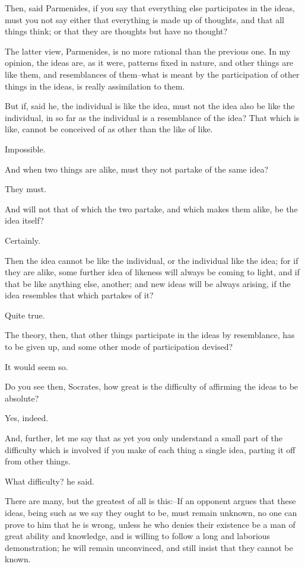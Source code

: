 Then, said Parmenides, if you say that everything else participates
in the ideas, must you not say either that everything is made up of
thoughts, and that all things think; or that they are thoughts but have
no thought?

The latter view, Parmenides, is no more rational than the previous one.
In my opinion, the ideas are, as it were, patterns fixed in nature, and
other things are like them, and resemblances of them--what is meant by
the participation of other things in the ideas, is really assimilation
to them.

But if, said he, the individual is like the idea, must not the idea also
be like the individual, in so far as the individual is a resemblance of
the idea? That which is like, cannot be conceived of as other than the
like of like.

Impossible.

And when two things are alike, must they not partake of the same idea?

They must.

And will not that of which the two partake, and which makes them alike,
be the idea itself?

Certainly.

Then the idea cannot be like the individual, or the individual like the
idea; for if they are alike, some further idea of likeness will always
be coming to light, and if that be like anything else, another; and new
ideas will be always arising, if the idea resembles that which partakes
of it?

Quite true.

The theory, then, that other things participate in the ideas by
resemblance, has to be given up, and some other mode of participation
devised?

It would seem so.

Do you see then, Socrates, how great is the difficulty of affirming the
ideas to be absolute?

Yes, indeed.

And, further, let me say that as yet you only understand a small part
of the difficulty which is involved if you make of each thing a single
idea, parting it off from other things.

What difficulty? he said.

There are many, but the greatest of all is this:--If an opponent argues
that these ideas, being such as we say they ought to be, must remain
unknown, no one can prove to him that he is wrong, unless he who denies
their existence be a man of great ability and knowledge, and is
willing to follow a long and laborious demonstration; he will remain
unconvinced, and still insist that they cannot be known.

